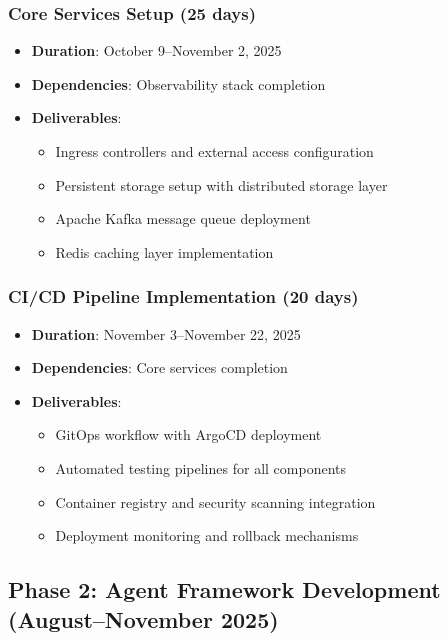 \documentclass[12pt]{report}
\begin{document}
\subsubsection{Core Services Setup (25 days)}
\begin{itemize}
  \item \textbf{Duration}: October 9--November 2, 2025
  \item \textbf{Dependencies}: Observability stack completion
  \item \textbf{Deliverables}:
    \begin{itemize}
      \item Ingress controllers and external access configuration
      \item Persistent storage setup with distributed storage layer
      \item Apache Kafka message queue deployment
      \item Redis caching layer implementation
    \end{itemize}
\end{itemize}

\subsubsection{CI/CD Pipeline Implementation (20 days)}
\begin{itemize}
  \item \textbf{Duration}: November 3--November 22, 2025
  \item \textbf{Dependencies}: Core services completion
  \item \textbf{Deliverables}:
    \begin{itemize}
      \item GitOps workflow with ArgoCD deployment
      \item Automated testing pipelines for all components
      \item Container registry and security scanning integration
      \item Deployment monitoring and rollback mechanisms
    \end{itemize}
\end{itemize}

\subsection{Phase 2: Agent Framework Development (August--November 2025)}
\end{document}
